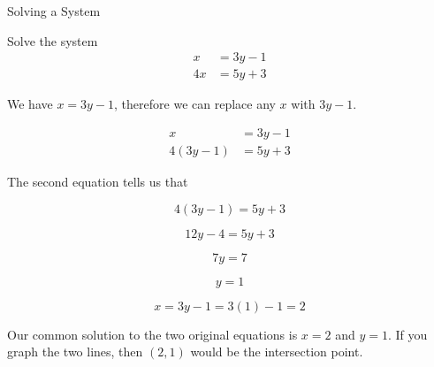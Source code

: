 \documentclass{ximera}
\begin{document}
\begin{example} Solving a System


Solve the system
\begin{align*}
x & = 3y - 1 \\
4x & = 5y + 3
\end{align*}

\begin{explanation}

We have $x = 3y - 1$, therefore we can replace any $x$ with $3y - 1$.  

\begin{align*}
x & = 3y - 1 \\
4(3y - 1) & = 5y + 3
\end{align*}


The second equation tells us that 


\[   4(3y - 1) = 5y + 3   \]

\[   12y- 4 = 5y + 3   \]


\[ 7y = 7 \]


\[ y = 1 \]


\[ x = 3y - 1= 3(1) - 1 = 2\]

Our common solution to the two original equations is $x = 2$ and $y = 1$.  If you graph the two lines, then $(2, 1)$ would be the intersection point.

\end{explanation}
\end{example}
\end{document}
